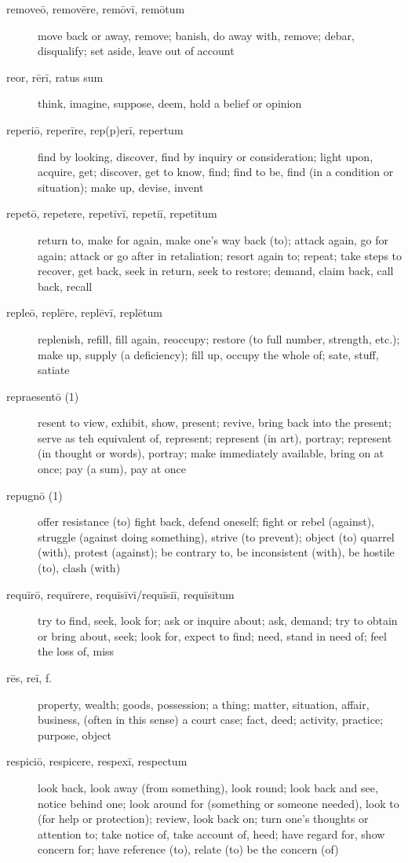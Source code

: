 \begin{description}
    \item[removeō, removēre, remōvī, remōtum] \marginnote{*}move back or away, remove; banish, do away with, remove; debar, disqualify; set aside, leave out of account
    \item[reor, rērī, ratus sum] \marginnote{*}think, imagine, suppose, deem, hold a belief or opinion
    \item[reperiō, reperīre, rep(p)erī, repertum] \marginnote{*}find by looking, discover, find by inquiry or consideration; light upon, acquire, get; discover, get to know, find; find to be, find (in a condition or situation); make up, devise, invent
    \item[repetō, repetere, repetīvī, repetiī, repetītum] \marginnote{*}return to, make for again, make one's way back (to); attack again, go for again; attack or go after in retaliation; resort again to; repeat; take steps to recover, get back, seek in return, seek to restore; demand, claim back, call back, recall
    \item[repleō, replēre, replēvī, replētum] replenish, refill, fill again, reoccupy; restore (to full number, strength, etc.); make up, supply (a deficiency); fill up, occupy the whole of; sate, stuff, satiate
    \item[repraesentō (1)] resent to view, exhibit, show, present; revive, bring back into the present; serve as teh equivalent of, represent; represent (in art), portray; represent (in thought or words), portray; make immediately available, bring on at once; pay (a sum), pay at once
    \item[repugnō (1)] offer resistance (to) fight back, defend oneself; fight or rebel (against), struggle (against doing something), strive (to prevent); object (to) quarrel (with), protest (against); be contrary to, be inconsistent (with), be hostile (to), clash (with)
    \item[requīrō, requīrere, requīsīvī/requīsiī, requīsītum] try to find, seek, look for; ask or inquire about; ask, demand; try to obtain or bring about, seek; look for, expect to find; need, stand in need of; feel the loss of, miss
    \item[rēs, reī, f.] \marginnote{*}property, wealth; goods, possession; a thing; matter, situation, affair, business, (often in this sense) a court case; fact, deed; activity, practice; purpose, object
    \item[respiciō, respicere, respexī, respectum] \marginnote{*}look back, look away (from something), look round; look back and see, notice behind one; look around for (something or someone needed), look to (for help or protection); review, look back on; turn one's thoughts or attention to; take notice of, take account of, heed; have regard for, show concern for; have reference (to), relate (to) be the concern (of)

\end{description}
